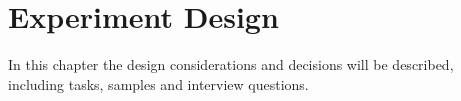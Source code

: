 
\chapter{Experiment Design}
\label{chapter:ExperimentDesign}
In this chapter the design considerations and decisions will be described, including tasks, samples and interview questions.







